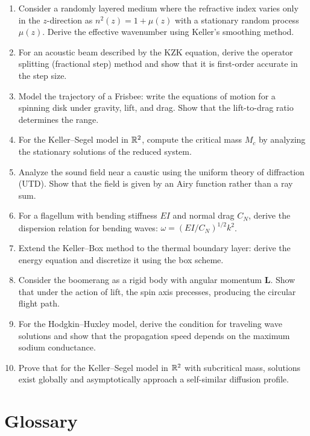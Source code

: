 \begin{enumerate}
  \item [I] Consider a randomly layered medium where the refractive index varies only in the \(z\)-direction as \(n^2(z) = 1 + \mu(z)\) with a stationary random process \(\mu(z)\). Derive the effective wavenumber using Keller's smoothing method.
  \item [B] For an acoustic beam described by the KZK equation, derive the operator splitting (fractional step) method and show that it is first-order accurate in the step size.
  \item [I] Model the trajectory of a Frisbee: write the equations of motion for a spinning disk under gravity, lift, and drag. Show that the lift-to-drag ratio determines the range.
  \item [A] For the Keller--Segel model in \(\mathbb{R}^2\), compute the critical mass \(M_c\) by analyzing the stationary solutions of the reduced system.
  \item [I] Analyze the sound field near a caustic using the uniform theory of diffraction (UTD). Show that the field is given by an Airy function rather than a ray sum.
  \item [I] For a flagellum with bending stiffness \(EI\) and normal drag \(C_N\), derive the dispersion relation for bending waves: \(\omega = (EI/C_N)^{1/2} k^2\).
  \item [I] Extend the Keller--Box method to the thermal boundary layer: derive the energy equation and discretize it using the box scheme.
  \item [I] Consider the boomerang as a rigid body with angular momentum \(\mathbf{L}\). Show that under the action of lift, the spin axis precesses, producing the circular flight path.
  \item [I] For the Hodgkin--Huxley model, derive the condition for traveling wave solutions and show that the propagation speed depends on the maximum sodium conductance.
  \item [A] Prove that for the Keller--Segel model in \(\mathbb{R}^2\) with subcritical mass, solutions exist globally and asymptotically approach a self-similar diffusion profile.
\end{enumerate}

\section*{Glossary}

